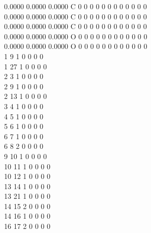 \documentclass[11pt,titlepage,dvipdfmx,twoside]{article}
\begin{document}
\begin{oframed}
{    0.0000    0.0000    0.0000  C  0  0  0  0  0  0  0  0  0  0  0  0      \\
    0.0000    0.0000    0.0000  C  0  0  0  0  0  0  0  0  0  0  0  0      \\
    0.0000    0.0000    0.0000  C  0  0  0  0  0  0  0  0  0  0  0  0      \\
    0.0000    0.0000    0.0000  O  0  0  0  0  0  0  0  0  0  0  0  0      \\
    0.0000    0.0000    0.0000  O  0  0  0  0  0  0  0  0  0  0  0  0      \\
  1  9  1  0  0  0  0                                                      \\
  1 27  1  0  0  0  0                                                      \\
  2  3  1  0  0  0  0                                                      \\
  2  9  1  0  0  0  0                                                      \\
  2 13  1  0  0  0  0                                                      \\
  3  4  1  0  0  0  0                                                      \\
  4  5  1  0  0  0  0                                                      \\
  5  6  1  0  0  0  0                                                      \\
  6  7  1  0  0  0  0                                                      \\
  6  8  2  0  0  0  0                                                      \\
  9 10  1  0  0  0  0                                                      \\
 10 11  1  0  0  0  0                                                      \\
 10 12  1  0  0  0  0                                                      \\
 13 14  1  0  0  0  0                                                      \\
 13 21  1  0  0  0  0                                                      \\
 14 15  2  0  0  0  0                                                      \\
 14 16  1  0  0  0  0                                                      \\
 16 17  2  0  0  0  0                                                      \\
}
\end{oframed}
\end{document}
